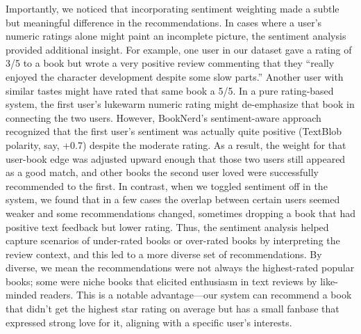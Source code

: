 \documentclass[11pt]{article}
\begin{document}
Importantly, we noticed that incorporating sentiment weighting made a subtle but meaningful difference in the recommendations. In cases where a user’s numeric ratings alone might paint an incomplete picture, the sentiment analysis provided additional insight. For example, one user in our dataset gave a rating of 3/5 to a book but wrote a very positive review commenting that they “really enjoyed the character development despite some slow parts.” Another user with similar tastes might have rated that same book a 5/5. In a pure rating-based system, the first user’s lukewarm numeric rating might de-emphasize that book in connecting the two users. However, BookNerd’s sentiment-aware approach recognized that the first user’s sentiment was actually quite positive (TextBlob polarity, say, +0.7) despite the moderate rating. As a result, the weight for that user-book edge was adjusted upward enough that those two users still appeared as a good match, and other books the second user loved were successfully recommended to the first. In contrast, when we toggled sentiment off in the system, we found that in a few cases the overlap between certain users seemed weaker and some recommendations changed, sometimes dropping a book that had positive text feedback but lower rating. Thus, the sentiment analysis helped capture scenarios of under-rated books or over-rated books by interpreting the review context, and this led to a more diverse set of recommendations. By diverse, we mean the recommendations were not always the highest-rated popular books; some were niche books that elicited enthusiasm in text reviews by like-minded readers. This is a notable advantage—our system can recommend a book that didn’t get the highest star rating on average but has a small fanbase that expressed strong love for it, aligning with a specific user’s interests.
\end{document}
